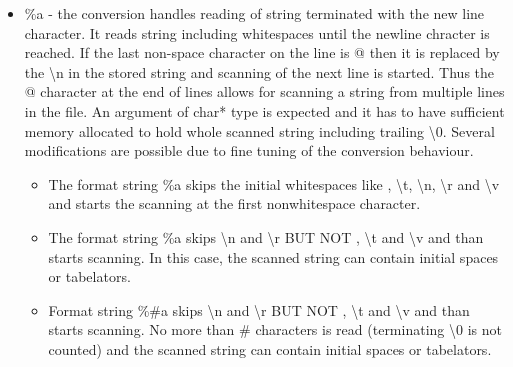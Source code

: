 \begin{itemize}
\begin {itemize}
      \item {\sf \textquotedbl\%a\textquotedbl} - the conversion handles reading of string terminated with the new 
       line character. It reads string including whitespaces until the newline chracter is reached. If the 
       last non-space character on the line is {\sf @} then it is replaced by the {\sf \textbackslash n} 
       in the stored string and scanning of the next line is started. Thus the {\sf @} character at the end of 
       lines allows for scanning a string from multiple lines in the file.
       An argument of {\sf char*} type is expected and it has to have sufficient memory allocated to hold
       whole scanned  string including trailing \textbackslash 0. Several modifications are possible due to
       fine tuning of the conversion behaviour.
         \begin{itemize}
         \item  The format string {\sf \textquotedbl \%a\textquotedbl} skips the initial whitespaces  like 
                {\sf \textvisiblespace}, {\sf \textbackslash t}, {\sf \textbackslash n}, 
                {\sf \textbackslash r} and {\sf \textbackslash v} 
                and starts the scanning at the first nonwhitespace character.
         \item  The format string {\sf \textquotedbl\%\textvisiblespace a\textquotedbl} skips {\sf \textbackslash n} and 
                {\sf \textbackslash r} BUT NOT {\sf \textvisiblespace}, 
                {\sf \textbackslash t} and {\sf \textbackslash v} 
                and than starts scanning. In this case, the scanned string can contain initial spaces or tabelators.
         \item  Format string {\sf \textquotedbl\%\textvisiblespace \#a\textquotedbl} skips {\sf \textbackslash n} and 
                {\sf \textbackslash r} BUT NOT {\sf \textvisiblespace}, 
                {\sf \textbackslash t} and {\sf \textbackslash v} and than starts scanning. 
                No more than {\sf \#} characters is read (terminating {\sf \textbackslash 0} is not counted) and the scanned string can 
                contain initial spaces or tabelators.
         \end{itemize}
     

\end{itemize}
\end{itemize}
